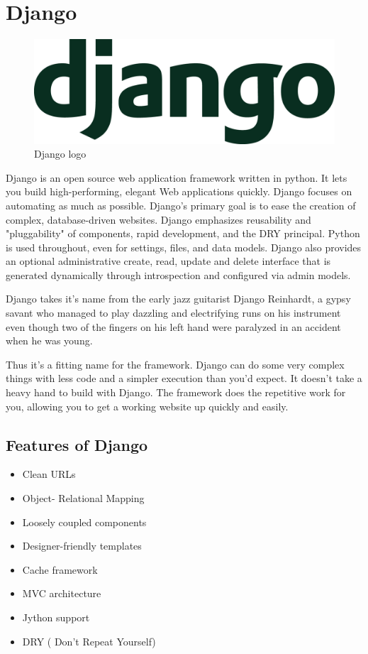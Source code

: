 \section{Django}

\begin{figure}[h]
\centering \includegraphics[scale=0.13]{images/django.png}
\caption{Django logo}
\end{figure}
\noindent Django is an open source web application framework written in python. It lets 
you build high-performing, elegant Web applications quickly. Django 
focuses on automating as much as possible. Django's primary goal is to 
ease the creation of complex, database-driven websites. Django 
emphasizes reusability and "pluggability" of components, rapid 
development, and the DRY principal. Python is used throughout, even 
for settings, files, and data models. Django also provides an optional
 administrative create, read, update and delete interface that is 
generated dynamically through introspection and configured via admin 
models.

Django takes it's name from the early jazz guitarist Django Reinhardt, 
a gypsy savant who managed to play dazzling and electrifying runs on 
his instrument even though two of the fingers on his left hand were 
paralyzed in an accident when he was young.

Thus it’s a fitting name for the framework. Django can do some very 
complex things with less code and a simpler execution than you’d expect. 
It doesn't take a heavy hand to build with Django. The framework does 
the repetitive work for you, allowing you to get a working website up 
quickly and easily.
\subsection{Features of Django}
\begin{itemize}
\item Clean URLs
\item Object- Relational Mapping
\item Loosely coupled components
\item Designer-friendly templates  
\item Cache framework 
\item MVC architecture
\item Jython support
\item DRY ( Don't Repeat Yourself)
\end{itemize}
